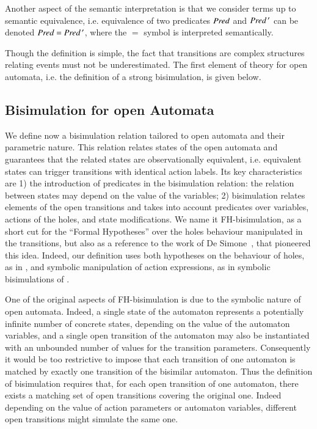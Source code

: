 \documentclass{elsarticle}
\newcommand{\TODO}[1]{\textcolor{red}{\textbf{[TODO:#1]}}}
\begin{document}
Another aspect of the semantic interpretation is that we consider terms up to semantic equivalence, i.e. equivalence of two predicates
$\Pred$ and $\Pred\,'$ can be denoted $\Pred=\Pred\,'$, where the $=$ symbol is interpreted semantically.

	
Though the definition is simple, the fact that transitions are complex structures relating events must not be underestimated. The first element of theory for open automata, i.e. the definition of a strong bisimulation, is given below.


\subsection{Bisimulation for open Automata}
\label{section:bisimulation}

%

We define now a bisimulation relation tailored to open automata and their parametric nature. This relation relates states of the open automata and guarantees that the related states are observationally equivalent, i.e. equivalent states can trigger transitions with identical action labels. Its key characteristics are 1) the introduction of predicates in the bisimulation relation: the relation between states may depend on the value of the variables; 2)  bisimulation  relates elements of the open transitions and takes into account predicates over variables, actions of the holes, and state modifications.
 We name it FH-bisimulation,
 as a short cut for the ``Formal Hypotheses'' over the holes behaviour manipulated in the
 transitions, but also as a reference to the work of De Simone~\cite{deSimone85},
 that pioneered this idea.
Indeed, our definition uses both hypotheses on the behaviour of holes, as in \cite{deSimone85}, and symbolic manipulation of action expressions, as in symbolic bisimulations of \cite{HennessyLin:TCS95}. 


One of the original aspects of FH-bisimulation is due to the symbolic nature of open automata. Indeed, a single state of the automaton represents a potentially infinite number of concrete states, depending on the value of the automaton variables, and a single open transition of the automaton may also be instantiated with an unbounded number of values for the transition parameters. Consequently it would be too restrictive to impose that each transition of one automaton is matched by exactly one transition of the bisimilar automaton. Thus the definition of bisimulation requires that, for each open transition of one automaton, there exists a matching  set of open transitions covering the original one. Indeed depending on the value of action parameters or automaton variables, different open transitions might simulate the same one.
\end{document}
